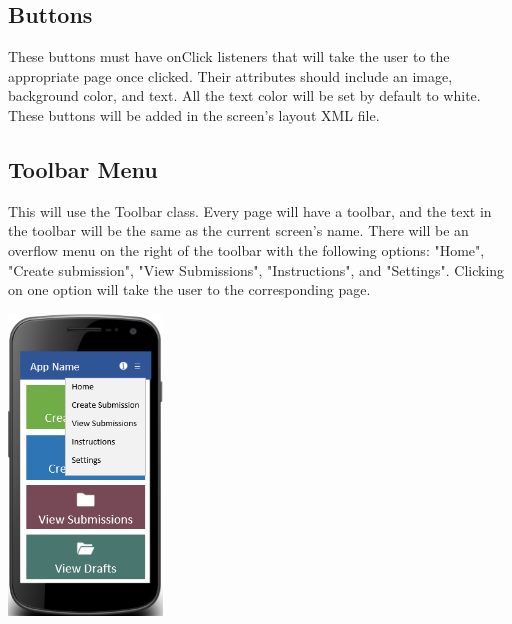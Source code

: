 \documentclass[onecolumn, draftclsnofoot, article, 10pt, compsoc]{IEEEtran}
\begin{document}
\subsection{Buttons}
These buttons must have onClick listeners that will take the user to the appropriate page once clicked. Their attributes should include an image, background color, and text. All the text color will be set by default to white. These buttons will be added in the screen's layout XML file.

\subsection{Toolbar Menu}
This will use the Toolbar class. Every page will have a toolbar, and the text in the toolbar will be the same as the current screen's name. There will be an overflow menu on the right of the toolbar with the following options: "Home", "Create submission", "View Submissions", "Instructions", and "Settings". Clicking on one option will take the user to the corresponding page. 
\newline
\begin{center}
\includegraphics[height=8cm]{menuscreen.png}
\end{center}
\end{document}
